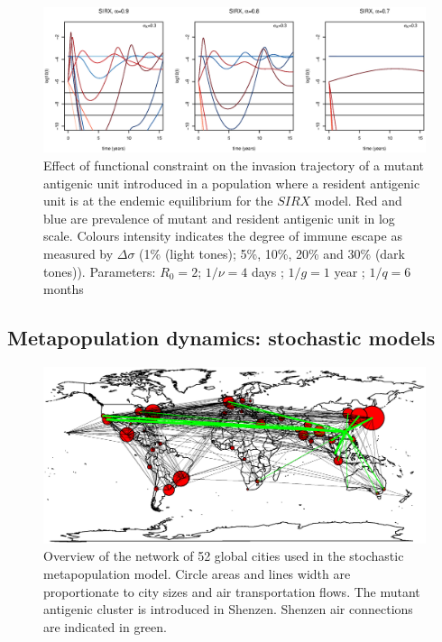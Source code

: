 \begin{figure}[!hp]
  \center
  \includegraphics[width=0.9\linewidth]{texte/article3/appendix_diamond/graph/traj_deter_trade_off.eps}
  \caption{Effect of functional constraint on the invasion trajectory
    of a mutant antigenic unit introduced in a population where a
    resident antigenic unit is at the endemic equilibrium for the
    $SIRX$ model. Red and blue are prevalence of mutant and resident
    antigenic unit in log scale. Colours intensity indicates the
    degree of immune escape as measured by $\Delta\sigma$ (1\% (light
    tones); 5\%, 10\%, 20\% and 30\% (dark tones)). Parameters:
    $R_0=2$; $1/\nu=4$ days ; $1/g=1$ year ; $1/q=6$ months}
  \label{fig:traj_deter_trade_off}
\end{figure}

\clearpage

\subsection{Metapopulation dynamics: stochastic models}

\begin{figure}[!hp]
  \center
  \includegraphics[width=0.6\linewidth]{texte/article3/appendix_diamond/graph/mapHK.eps}
  \caption{Overview of the network of 52 global cities used in the
    stochastic metapopulation model. Circle areas and lines width are
    proportionate to city sizes and air transportation flows. The
    mutant antigenic cluster is introduced in Shenzen. Shenzen air
    connections are indicated in green.}
  \label{fig:mapHK}
\end{figure}

